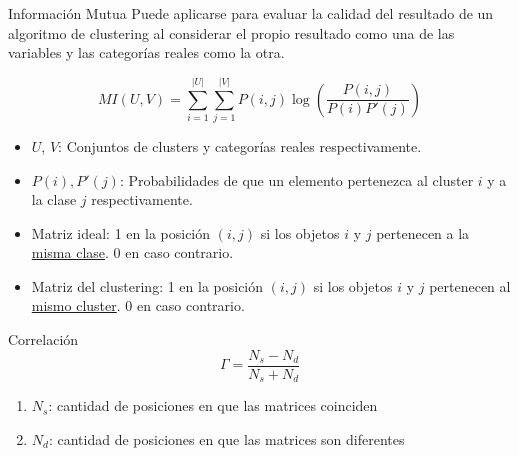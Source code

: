 \begin{frame}

    \begin{block}{Información Mutua}
        Puede aplicarse para evaluar la calidad del resultado de un algoritmo de clustering al considerar el propio resultado como una de las variables y las categorías reales como la otra.
    \end{block}

    \pause

    \begin{equation*}
        MI(U,V) = \sum_{i=1}^{|U|}\sum_{j=1}^{|V|}{P(i,j)\log{\left( \frac{P(i,j)}{P(i)P'(j)} \right)}}
    \end{equation*}

    \begin{itemize}
        \item $U$, $V$: Conjuntos de clusters y categorías reales respectivamente.
        \item $P(i), P'(j)$: Probabilidades de que un elemento pertenezca al cluster $i$ y a la clase $j$ respectivamente.
    \end{itemize}

\end{frame}

\begin{frame}

    \begin{itemize}
        \item Matriz ideal: 1 en la posición $(i,j)$ si los objetos $i$ y $j$ pertenecen a la \underline{misma clase}.
        0 en caso contrario.
        \item Matriz del clustering: 1 en la posición $(i,j)$ si los objetos $i$ y $j$ pertenecen al \underline{mismo cluster}.
        0 en caso contrario.
    \end{itemize}

    \begin{block}{Correlación}
        \begin{equation*}
            \Gamma = \frac{N_s - N_d}{N_s + N_d}
        \end{equation*}
    \end{block}

    \begin{enumerate}
        \item $N_s$: cantidad de posiciones en que las matrices coinciden
        \item $N_d$: cantidad de posiciones en que las matrices son diferentes
    \end{enumerate}

\end{frame}

